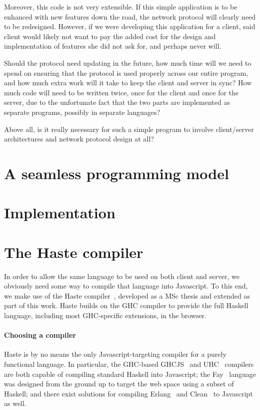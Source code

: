 \documentclass[preprint]{sigplanconf}
\begin{document}
Moreover, this code is not very extensible. If this simple application is to be
enhanced with new features down the road, the network protocol will clearly
need to be redesigned. However, if we were developing this application for a
client, said client would likely not want to pay the added cost for the design
and implementation of features she did not ask for, and perhaps never will.

Should the protocol need updating in the future, how much time will we need to
spend on ensuring that the protocol is used properly across our entire program,
and how much extra work will it take to keep the client and server in sync?
How much code will need to be written twice, once for the client and once for
the server, due to the unfortunate fact that the two parts are implemented as
separate programs, possibly in separate languages?

Above all, is it really necessary for such a simple program to involve
client/server architectures and network protocol design at all?

\section{A seamless programming model}
\section{Implementation}
\section{The Haste compiler}

In order to allow the same language to be used on both client and server, we
obviously need some way to compile that language into Javascript. To this end,
we make use of the Haste compiler\ \cite{haste}, developed as a MSc thesis and
extended as part of this work. Haste builds on the GHC compiler to provide
the full Haskell language, including most GHC-specific extensions, in the
browser.

\paragraph{Choosing a compiler} Haste is by no means the only
Javascript-targeting compiler for a purely functional language. In particular,
the GHC-based GHCJS\ \cite{ghcjs} and UHC\ \cite{uhc} compilers are both
capable of compiling standard Haskell into Javascript; the Fay\ \cite{fay}
language was designed from the ground up to target the web space using a subset
of Haskell; and there exist solutions for compiling Erlang\ \cite{jserlang} and
Clean\ \cite{jsclean} to Javascript as well.
\end{document}
